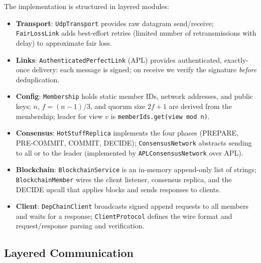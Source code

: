 \documentclass{llncs}
\begin{document}
The implementation is structured in layered modules:
\begin{itemize}
  \setlength{\itemsep}{1pt}\setlength{\parsep}{0pt}\setlength{\topsep}{2pt}
  \item \textbf{Transport}: \texttt{UdpTransport} provides raw datagram send/receive; \texttt{FairLossLink} adds best-effort retries (limited number of retransmissions with delay) to approximate fair loss.
  \item \textbf{Links}: \texttt{AuthenticatedPerfectLink} (APL) provides authenticated, exactly-once delivery: each message is signed; on receive we verify the signature \emph{before} deduplication.
  \item \textbf{Config}: \texttt{Membership} holds static member IDs, network addresses, and public keys; $n$, $f = (n-1)/3$, and quorum size $2f+1$ are derived from the membership; leader for view $v$ is \texttt{memberIds.get(view mod n)}.
  \item \textbf{Consensus}: \texttt{HotStuffReplica} implements the four phases (PREPARE, PRE-COMMIT, COMMIT, DECIDE); \texttt{ConsensusNetwork} abstracts sending to all or to the leader (implemented by \texttt{APLConsensusNetwork} over APL).
  \item \textbf{Blockchain}: \texttt{BlockchainService} is an in-memory append-only list of strings; \texttt{BlockchainMember} wires the client listener, consensus replica, and the DECIDE upcall that applies blocks and sends responses to clients.
  \item \textbf{Client}: \texttt{DepChainClient} broadcasts signed append requests to all members and waits for a response; \texttt{ClientProtocol} defines the wire format and request/response parsing and verification.
\end{itemize}

\subsection{Layered Communication}
\end{document}
